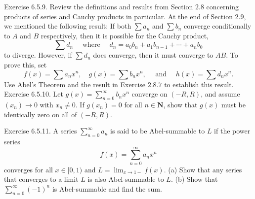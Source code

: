Exercise 6.5.9. Review the definitions and results from Section $2.8$ concerning products of series and Cauchy products in particular. At the end of Section 2.9, we mentioned the following result: If both $\sum a_{n}$ and $\sum b_{n}$ converge conditionally to $A$ and $B$ respectively, then it is possible for the Cauchy product,
$$
\sum d_{n} \quad \text { where } \quad d_{n}=a_{0} b_{n}+a_{1} b_{n-1}+\cdots+a_{n} b_{0}
$$
to diverge. However, if $\sum d_{n}$ does converge, then it must converge to $A B$. To prove this, set
$$
f(x)=\sum a_{n} x^{n}, \quad g(x)=\sum b_{n} x^{n}, \quad \text { and } \quad h(x)=\sum d_{n} x^{n} .
$$
Use Abel's Theorem and the result in Exercise $2.8 .7$ to establish this result.
Exercise 6.5.10. Let $g(x)=\sum_{n=0}^{\infty} b_{n} x^{n}$ converge on $(-R, R)$, and assume $\left(x_{n}\right) \rightarrow 0$ with $x_{n} \neq 0$. If $g\left(x_{n}\right)=0$ for all $n \in \mathbf{N}$, show that $g(x)$ must be identically zero on all of $(-R, R)$.

Exercise 6.5.11. A series $\sum_{n=0}^{\infty} a_{n}$ is said to be Abel-summable to $L$ if the power series
$$
f(x)=\sum_{n=0}^{\infty} a_{n} x^{n}
$$
converges for all $x \in[0,1)$ and $L=\lim _{x \rightarrow 1-} f(x)$.
(a) Show that any series that converges to a limit $L$ is also Abel-summable to $L$.
(b) Show that $\sum_{n=0}^{\infty}(-1)^{n}$ is Abel-summable and find the sum.
